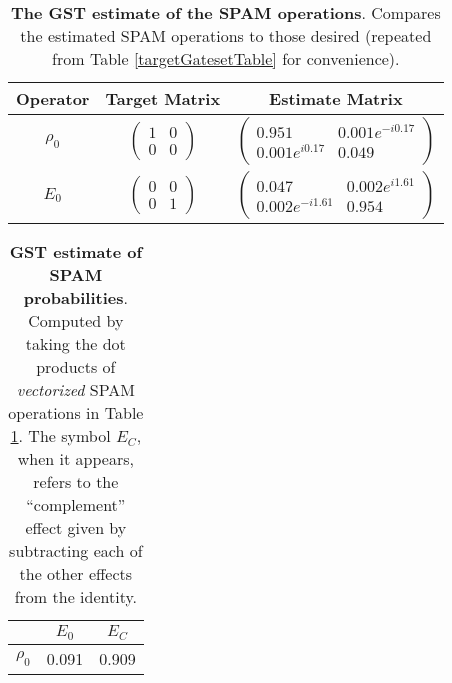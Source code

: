 \documentclass{article}[11pt]
\begin{document}
\begin{table}[h]
\begin{center}
\begin{tabular}[l]{|c|c|c|}
\hline
Operator & Target Matrix & Estimate Matrix \\ \hline
$\rho_{0}$ & $ \left(\!\!\begin{array}{cc}
1 & 0 \\ 
0 & 0
 \end{array}\!\!\right) $
 & $ \left(\!\!\begin{array}{cc}
0.951 & 0.001e^{-i0.17} \\ 
0.001e^{i0.17} & 0.049
 \end{array}\!\!\right) $
 \\ \hline
$E_{0}$ & $ \left(\!\!\begin{array}{cc}
0 & 0 \\ 
0 & 1
 \end{array}\!\!\right) $
 & $ \left(\!\!\begin{array}{cc}
0.047 & 0.002e^{i1.61} \\ 
0.002e^{-i1.61} & 0.954
 \end{array}\!\!\right) $
 \\ \hline
\end{tabular}

\caption{\textbf{The GST estimate of the SPAM operations}.  Compares the estimated SPAM operations to those desired (repeated from Table \ref{targetGatesetTable} for convenience).\label{bestGatesetSpamTable}}
\end{center}
\end{table}

\begin{table}[h]
\begin{center}
\begin{tabular}[l]{|c|c|c|}
\hline
 & $E_{0}$ & $E_C$ \\ \hline
$\rho_{0}$ & 0.091 & 0.909 \\ \hline
\end{tabular}

\caption{\textbf{GST estimate of SPAM probabilities}.  Computed by taking the dot products of \emph{vectorized} SPAM operations in Table \ref{bestGatesetSpamTable}.  The symbol $E_C$, when it appears, refers to the ``complement'' effect given by subtracting each of the other effects from the identity.\label{bestGatesetSpamParametersTable}}
\end{center}
\end{table}
\end{document}
